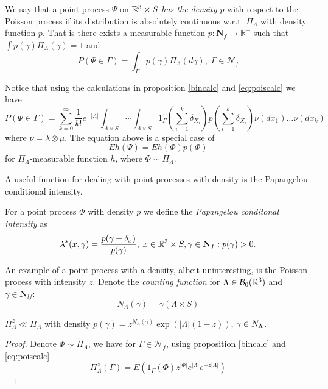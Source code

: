 \begin{definition}
We say that a point process $\Psi$ on ${\mathbb R^3} \times S$ \textit{has the density $p$} with respect to the Poisson process if its distribution is absolutely continuous w.r.t. $\Pi_\Lambda$ with density function $p$. That is there exists a measurable function $p: \mathbf N_f \to \mathbb R^+$ such that $\int p(\gamma) \Pi_\Lambda (\gamma)=1$ and
$$P(\Psi \in \Gamma) = \int_\Gamma p(\gamma) \Pi_\Lambda(d\gamma), \; \Gamma \in \mathcal N_{f}$$
\end{definition}

Notice that using the calculations in proposition \ref{bincalc} and \ref{eq:poiscalc} we have
$$
P(\Psi \in \Gamma) = \sum^\infty_{k=0} \frac{1}{k!} e^{-|\Lambda|} \int_{\Lambda\times S} \cdots \int_{\Lambda\times S} 1_{\Gamma} \left(\sum^k_{i=1} \delta_{X_i}\right) p\left(\sum^k_{i=1} \delta_{X_i}\right) \nu(dx_1) \dots \nu(dx_k)
$$
where $\nu=\lambda\otimes \mu$.
	The equation above is a special case of 
$$Eh(\Psi)=Eh(\Phi)p(\Phi)$$
for $\Pi_\Lambda$-measurable function $h$, where $\Phi \sim \Pi_\Lambda$.

A useful function for dealing with point processes with density is the Papangelou conditional intensity.
\begin{definition}
	For  a point process $\Phi$ with density $p$ we define the \textit{Papangelou conditonal intensity} as 
	$$\lambda^*(x,\gamma) = \frac{p(\gamma + \delta_x)}{p(\gamma)}, \; x \in {\mathbb R^3} \times S, \gamma \in \mathbf N_{f}: p(\gamma)>0.$$
\end{definition}

An example of a point process with a density, albeit uninteresting, is the Poisson process with intensity $z$.\newline
Denote the \textit{counting function} for $\Lambda \in \mathcal B_0({\mathbb R^3})$ and $\gamma \in \mathbf N_{lf}$:
$$N_\Lambda(\gamma) = \gamma(\Lambda \times S)$$ 

\begin{proposition} $\Pi_\Lambda^z \ll \Pi_\Lambda$ with density $p(\gamma)=z^{N_\Lambda(\gamma)} \exp(|\Lambda|(1-z))$, $\gamma \in \mathbf \mathbf N_{\Lambda}$.
\end{proposition}
\begin{proof}
	Denote $\Phi \sim \Pi_\Lambda$, we have for $\Gamma\in \mathcal N_{f}$, using proposition \ref{bincalc} and \ref{eq:poiscalc}
	$$\Pi^z_\Lambda(\Gamma) = E(1_\Gamma(\Phi)  z^{|\Phi|} e^{|\Lambda|} e^{-z|\Lambda|}) $$
\end{proof}


